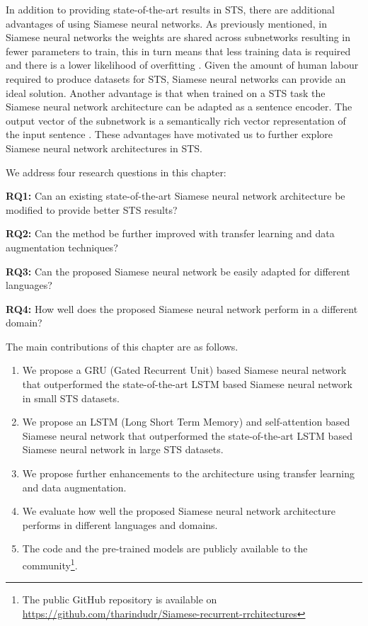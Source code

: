 In addition to providing state-of-the-art results in STS, there are additional advantages of using Siamese neural networks. As previously mentioned, in Siamese neural networks the weights are shared across subnetworks resulting in fewer parameters to train, this in turn means that less training data is required and there is a lower likelihood of overfitting  \autocite{ranasinghe-etal-2019-semantic}. Given the amount of human labour required to produce datasets for STS, Siamese neural networks can provide an ideal solution. Another advantage is that when trained on a STS task the Siamese neural network architecture can be adapted as a sentence encoder. The output vector of the subnetwork is a semantically rich vector representation of the input sentence \autocite{Mueller_Thyagarajan_2016}. These advantages have motivated us to further explore Siamese neural network architectures in STS. 


We address four research questions in this chapter:

\textbf{RQ1:} Can an existing state-of-the-art Siamese neural network architecture be modified to provide better STS results?

\textbf{RQ2:} Can the method be further improved with transfer learning and data augmentation techniques?

\textbf{RQ3:} Can the proposed Siamese neural network be easily adapted for different languages?

\textbf{RQ4:} How well does the proposed Siamese neural network perform in a different domain? 


The main contributions of this chapter are as follows.

\begin{enumerate}
	\item We propose a GRU (Gated Recurrent Unit) based Siamese neural network that outperformed the state-of-the-art LSTM based Siamese neural network in small STS datasets. 
	
	\item We propose an LSTM (Long Short Term Memory) and self-attention based Siamese neural network that outperformed the state-of-the-art LSTM based Siamese neural network in large STS datasets.
	
	\item We propose further enhancements to the architecture using transfer learning and data augmentation.  
	
	\item We evaluate how well the proposed Siamese neural network architecture performs in different languages and domains. 
	
	\item The code and the pre-trained models are publicly available to the community\footnote{The public GitHub repository is available on \url{https://github.com/tharindudr/Siamese-recurrent-rrchitectures}}.
\end{enumerate}


